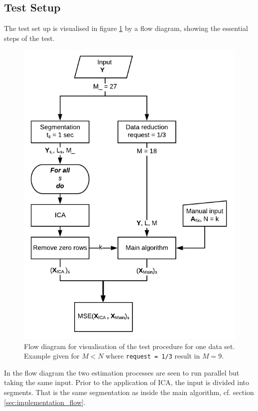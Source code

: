 \subsection{Test Setup}
The test set up is visualised in figure \ref{fig:flow2} by a flow diagram, showing the essential steps of the test. 
\begin{figure}[H]
    \centering
	\includegraphics[scale=1]{figures/ch_7/flow2.png}
	\caption{Flow diagram for visualisation of the test procedure for one data set. Example given for $M<N$ where \texttt{request = 1/3} result in $M=9$.}
	\label{fig:flow2}
\end{figure}
In the flow diagram the two estimation processes are seen to run parallel but taking the same input. 
Prior to the application of ICA, the input is divided into segments. 
That is the same segmentation as inside the main algorithm, cf. section \ref{sec:implementation_flow}.
